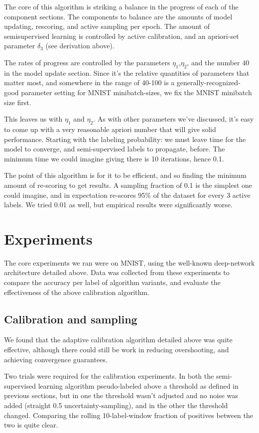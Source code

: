 \documentclass{article}
\begin{document}
The core of this algorithm is striking a balance in the progress of each of the component sections.  The components to balance are the amounts of model updating, rescoring, and active sampling per epoch.  The amount of semisupervised learning is controlled by active calibration, and an apriori-set parameter $\delta_3$ (see derivation above).  

The rates of progress are controlled by the parameters $\eta_1$,$\eta_2$, and the number 40 in the model update section.  Since it's the relative quantities of parameters that matter most, and somewhere in the range of 40-100 is a generally-recognized-good parameter setting for MNIST minibatch-sizes, we fix the MNIST minibatch size first.  

This leaves us with $\eta_1$ and $\eta_2$.  As with other parameters we've discussed, it's easy to come up with a very reasonable apriori number that will give solid performance.  Starting with the labeling probability: we must leave time for the model to converge, and semi-supervised labels to propagate, before.  The minimum time we could imagine giving there is 10 iterations, hence 0.1.  

The point of this algorithm is for it to be efficient, and so finding the minimum amount of re-scoring to get results.  A sampling fraction of 0.1 is the simplest one could imagine, and in expectation re-scores 95\% of the dataset for every 3 active labels.  We tried 0.01 as well, but empirical results were significantly worse.  



\section{Experiments}
The core experiments we ran were on MNIST, using the well-known deep-network architecture detailed above.  Data was collected from these experiments to compare the accuracy per label of algorithm variants, and evaluate the effectiveness of the above calibration algorithm.  

\subsection{Calibration and sampling}
We found that the adaptive calibration algorithm detailed above was quite effective, although there could still be work in reducing overshooting, and achieving convergence guarantees.  

Two trials were required for the calibration experiments.  In both the semi-supervised learning algorithm pseudo-labeled above a threshold as defined in previous sections, but in one the threshold wasn't adjusted and no noise was added (straight 0.5 uncertainty-sampling), and in the other the threshold changed.  Comparing the rolling 10-label-window fraction of positives between the two is quite clear.  
\end{document}
